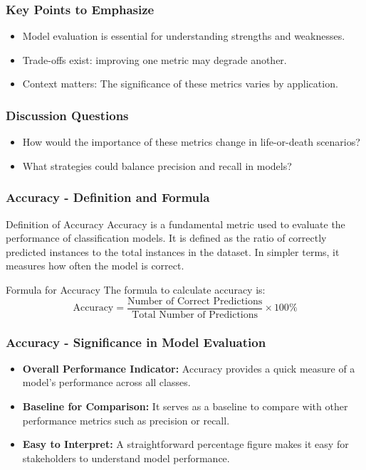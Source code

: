 \documentclass[aspectratio=169]{beamer}
\begin{document}
\begin{frame}[fragile]
    \frametitle{Key Points to Emphasize}
    \begin{itemize}
        \item Model evaluation is essential for understanding strengths and weaknesses.
        \item Trade-offs exist: improving one metric may degrade another.
        \item Context matters: The significance of these metrics varies by application.
    \end{itemize}
\end{frame}

\begin{frame}[fragile]
    \frametitle{Discussion Questions}
    \begin{itemize}
        \item How would the importance of these metrics change in life-or-death scenarios?
        \item What strategies could balance precision and recall in models?
    \end{itemize}
\end{frame}

\begin{frame}[fragile]
    \frametitle{Accuracy - Definition and Formula}
    \begin{block}{Definition of Accuracy}
        Accuracy is a fundamental metric used to evaluate the performance of classification models. 
        It is defined as the ratio of correctly predicted instances to the total instances in the dataset. 
        In simpler terms, it measures how often the model is correct.
    \end{block}
    
    \begin{block}{Formula for Accuracy}
        The formula to calculate accuracy is:
        \begin{equation}
            \text{Accuracy} = \frac{\text{Number of Correct Predictions}}{\text{Total Number of Predictions}} \times 100\%
        \end{equation}
    \end{block}
\end{frame}

\begin{frame}[fragile]
    \frametitle{Accuracy - Significance in Model Evaluation}
    \begin{itemize}
        \item \textbf{Overall Performance Indicator:} 
            Accuracy provides a quick measure of a model's performance across all classes.
        \item \textbf{Baseline for Comparison:} 
            It serves as a baseline to compare with other performance metrics such as precision or recall.
        \item \textbf{Easy to Interpret:} 
            A straightforward percentage figure makes it easy for stakeholders to understand model performance.
    \end{itemize}
\end{frame}
\end{document}
